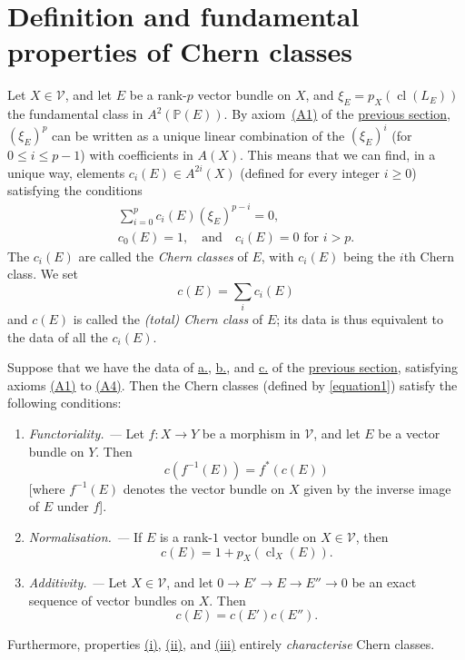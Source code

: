 \documentclass{article}
\theoremstyle{plain}
\newenvironment{theorem}[1]
    {\renewcommand\theinnercustomtheorem{#1}\innercustomtheorem}
    {\endinnercustomtheorem}
\theoremstyle{definition}
\newcommand{\cat}[1]{{\mathcal{#1}}}
\renewcommand{\geq}{\geqslant}
\renewcommand{\leq}{\leqslant}
\DeclareMathOperator{\cl}{cl}
\begin{document}
\section{Definition and fundamental properties of Chern classes}
\label{section3}

Let $X\in\cat{V}$, and let $E$ be a rank-$p$ vector bundle on $X$, and $\xi_E=p_X(\cl(L_E))$ the fundamental class in $A^2(\mathbb{P}(E))$.
By axiom~\hyperref[axiomA1]{(A1)} of the \hyperref[section2]{previous section}, $(\xi_E)^p$ can be written as a unique linear combination of the $(\xi_E)^i$ (for $0\leq i\leq p-1$) with coefficients in $A(X)$.
This means that we can find, in a unique way, elements $c_i(E)\in A^{2i}(X)$ (defined for every integer $i\geq0$) satisfying the conditions
\[
\label{equation1}
  \begin{gathered}
    \sum_{i=0}^p c_i(E)(\xi_E)^{p-i} = 0,
  \\c_0(E)=1,\quad\text{and}\quad c_i(E)=0\mbox{ for $i>p$.}
  \end{gathered}
\tag{1}
\]
The $c_i(E)$ are called the \emph{Chern classes} of $E$, with $c_i(E)$ being the $i$th Chern class.
We set
\[
\label{equation2}
  c(E) = \sum_i c_i(E)
\tag{2}
\]
and $c(E)$ is called the \emph{(total) Chern class} of $E$;
its data is thus equivalent to the data of all the $c_i(E)$.

\begin{theorem}{1}
\label{theorem1}
  Suppose that we have the data of \hyperref[dataa]{\rm{a.}}, \hyperref[datab]{\rm{b.}}, and \hyperref[datac]{\rm{c.}} of the \hyperref[section2]{previous section}, satisfying axioms \hyperref[axiomA1]{\rm{(A1)}} to \hyperref[axiomA4]{\rm{(A4)}}.
  Then the Chern classes (defined by \cref{equation1}) satisfy the following conditions:
  \begin{enumerate}[\rm(i)]
    \item\label{theorem1i}
      \emph{Functoriality. ---}
      Let $f\colon X\to Y$ be a morphism in $\cat{V}$, and let $E$ be a vector bundle on $Y$.
      Then
      \[
      \label{equation3}
        c(f^{-1}(E)) = f^*(c(E))
      \tag{3}
      \]
      [where $f^{-1}(E)$ denotes the vector bundle on $X$ given by the inverse image of $E$ under $f$].
    \item\label{theorem1ii}
      \emph{Normalisation. ---}
      If $E$ is a rank-$1$ vector bundle on $X\in\cat{V}$, then
      \[
      \label{equation4}
        c(E) = 1+p_X(\cl_X(E)).
      \tag{4}
      \]
    \item\label{theorem1iii}
      \emph{Additivity. ---}
      Let $X\in\cat{V}$, and let $0\to E'\to E\to E''\to 0$ be an exact sequence of vector bundles on $X$.
      Then
      \[
      \label{equation5}
        c(E) = c(E')c(E'').
      \tag{5}
      \]
  \end{enumerate}

  Furthermore, properties \hyperref[theorem1i]{\rm{(i)}}, \hyperref[theorem1ii]{\rm{(ii)}}, and \hyperref[theorem1iii]{\rm{(iii)}} entirely \emph{characterise} Chern classes.
\end{theorem}
\end{document}
